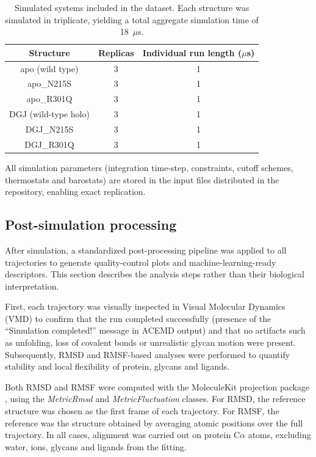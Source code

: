 \documentclass{article}
\begin{document}
\begin{table}[h]
    \centering
    \begin{tabular}{ccc}
    \toprule
      Structure   & Replicas & Individual run length ($\mu$s) \\
      \midrule
       apo (wild type)   & 3 & 1 \\
       apo\_N215S        & 3 & 1\\
       apo\_R301Q        & 3 & 1\\
       \midrule
       DGJ (wild-type holo) & 3 & 1 \\
       DGJ\_N215S        & 3 & 1 \\
       DGJ\_R301Q        & 3 & 1 \\
       \bottomrule
    \end{tabular}
    \caption{Simulated systems included in the dataset.
    Each structure was simulated in triplicate, yielding a total aggregate simulation time of 18~$\mu$s.}
    \label{tab:simulations}
\end{table}

All simulation parameters (integration time-step, constraints, cutoff schemes, thermostats and barostats) are stored in the input files distributed in the repository, enabling exact replication.

\subsection{Post-simulation processing}

After simulation, a standardized post-processing pipeline was applied to all trajectories to generate quality-control plots and machine-learning-ready descriptors.
This section describes the analysis steps rather than their biological interpretation.

First, each trajectory was visually inspected in Visual Molecular Dynamics (VMD) \cite{HUMP96} to confirm that the run completed successfully (presence of the ``Simulation completed!'' message in ACEMD output) and that no artifacts such as unfolding, loss of covalent bonds or unrealistic glycan motion were present.
Subsequently, RMSD and RMSF-based analyses were performed to quantify stability and local flexibility of protein, glycans and ligands.

Both RMSD and RMSF were computed with the MoleculeKit projection package \cite{doerr2016htmd}, using the \textit{MetricRmsd} and \textit{MetricFluctuation} classes.
For RMSD, the reference structure was chosen as the first frame of each trajectory.
For RMSF, the reference was the structure obtained by averaging atomic positions over the full trajectory.
In all cases, alignment was carried out on protein C$\alpha$ atoms, excluding water, ions, glycans and ligands from the fitting.
\end{document}
